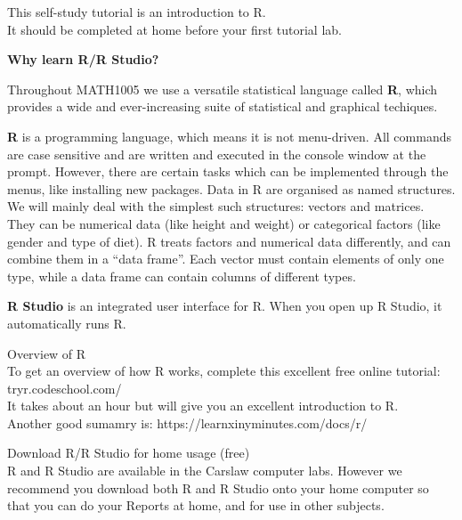 \documentclass[bigtut]{tutorial}\usepackage[]{graphicx}\usepackage[]{color}
\begin{document}

\begin{tutorial}

\begin{displaybox}
This self-study tutorial is an introduction to R. \\
It should be completed at home before your first tutorial lab.\\
\end{displaybox}
\vskip -2mm

\vspace{.5cm}
{\bf Why learn R/R Studio?}   

Throughout MATH1005 we use a versatile statistical language called {\bf R}, which provides a wide and ever-increasing suite of statistical and graphical techiques. 

{\bf R} is a programming language, which means it is not menu-driven. All commands are case sensitive and are written and executed in the console window at the prompt. However, there
are certain tasks which can be implemented through the menus, like installing new packages. 
Data in R are organised as named structures. We will mainly deal with
the simplest such structures: vectors and matrices. They can be numerical data (like
height and weight) or categorical factors (like gender and type of diet). R treats factors and numerical data differently, and can combine them in a “data frame”. Each vector must contain elements of only one type, while a data frame can contain columns of different types. 

{\bf R Studio} is an integrated user interface for R.  When you open up R Studio, it automatically runs R.

\vspace{.5cm}
\begin{questions}

\question Overview of R  \\

To get an overview of how R works, complete this excellent free online tutorial: tryr.codeschool.com/ \\ 
It takes about an hour but will give you an excellent introduction to R. \\

Another good sumamry is: https://learnxinyminutes.com/docs/r/

\question Download R/R Studio for home usage (free)  \\

R and R Studio are available in the Carslaw computer labs. However we recommend you download both R and R Studio onto your home computer so that you can do your Reports at home, and for use in other subjects. \\


\end{questions}
\end{tutorial}
\end{document}
